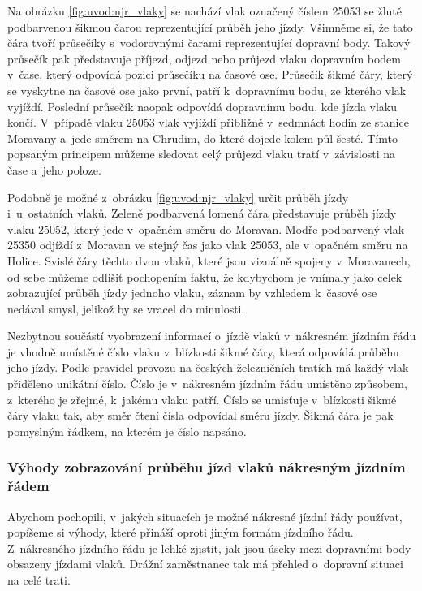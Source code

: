 Na obrázku \ref{fig:uvod:njr_vlaky} se nachází vlak označený číslem 25053 se žlutě podbarvenou šikmou čarou reprezentující průběh jeho jízdy. Všimněme si, že tato čára tvoří průsečíky s~vodorovnými čarami reprezentující dopravní body. Takový průsečík pak představuje příjezd, odjezd nebo průjezd vlaku dopravním bodem v~čase, který odpovídá pozici průsečíku na časové ose. Průsečík šikmé čáry, který se vyskytne na časové ose jako první, patří k~dopravnímu bodu, ze kterého vlak vyjíždí. Poslední průsečík naopak odpovídá dopravnímu bodu, kde jízda vlaku končí. V~případě vlaku 25053 vlak vyjíždí přibližně v~sedmnáct hodin ze stanice Moravany a~jede směrem na Chrudim, do které dojede kolem půl šesté. Tímto popsaným principem můžeme sledovat celý průjezd vlaku tratí v~závislosti na čase a~jeho poloze.

Podobně je možné z~obrázku \ref{fig:uvod:njr_vlaky} určit průběh jízdy i~u~ostatních vlaků. Zeleně podbarvená lomená čára představuje průběh jízdy vlaku 25052, který jede v~opačném směru do Moravan. Modře podbarvený vlak 25350 odjíždí z~Moravan ve stejný čas jako vlak 25053, ale v~opačném směru na Holice. Svislé čáry těchto dvou vlaků, které jsou vizuálně spojeny v~Moravanech, od sebe můžeme odlišit pochopením faktu, že kdybychom je vnímaly jako celek zobrazující průběh jízdy jednoho vlaku, záznam by vzhledem k~časové ose nedával smysl, jelikož by se vracel do minulosti.

\pagebreak

Nezbytnou součástí vyobrazení informací o~jízdě vlaků v~nákresném jízdním řádu je vhodně umístěné číslo vlaku v~blízkosti šikmé čáry, která odpovídá průběhu jeho jízdy. Podle pravidel provozu na českých železničních tratích má každý vlak přiděleno unikátní číslo. Číslo je v~nákresném jízdním řádu umístěno způsobem, z~kterého je zřejmé, k~jakému vlaku patří. Číslo se umisťuje v~blízkosti šikmé čáry vlaku tak, aby směr čtení čísla odpovídal směru jízdy. Šikmá čára je pak pomyslným řádkem, na kterém je číslo napsáno.

\subsubsection*{Výhody zobrazování průběhu jízd vlaků nákresným jízdním řádem}

Abychom pochopili, v~jakých situacích je možné nákresné jízdní řády používat, popíšeme si výhody, které přináší oproti jiným formám jízdního řádu. Z~nákresného jízdního řádu je lehké zjistit, jak jsou úseky mezi dopravními body obsazeny jízdami vlaků. Drážní zaměstnanec tak má přehled o~dopravní situaci na celé trati.

